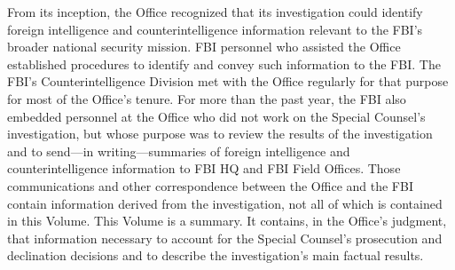 From its inception, the Office recognized that its investigation could identify foreign intelligence and counterintelligence information relevant to the FBI's broader national security mission.
FBI personnel who assisted the Office established procedures to identify and convey such information to the FBI\null.
The FBI's Counterintelligence Division met with the Office regularly for that purpose for most of the Office's tenure.
For more than the past year, the FBI also embedded personnel at the Office who did not work on the Special Counsel's investigation, but whose purpose was to review the results of the investigation and to send---in writing---summaries of foreign intelligence and counterintelligence information to FBI HQ and FBI Field Offices.
Those communications and other correspondence between the Office and the FBI contain information derived from the investigation, not all of which is contained in this Volume.
This Volume is a summary.
It contains, in the Office's judgment, that information necessary to account for the Special Counsel's prosecution and declination decisions and to describe the investigation's main factual results.

